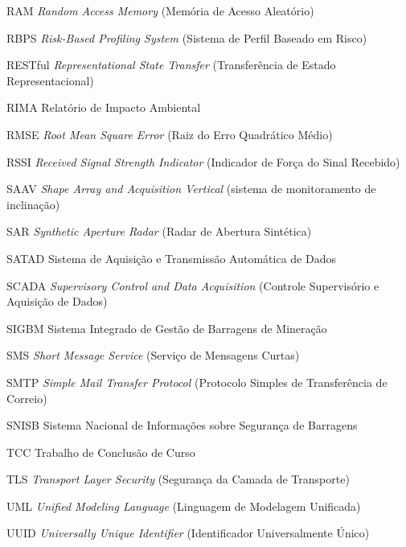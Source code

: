 \begin{siglas}
    \item[RAM] \textit{Random Access Memory} (Memória de Acesso Aleatório)
    \item[RBPS] \textit{Risk-Based Profiling System} (Sistema de Perfil Baseado em Risco)
    \item[RESTful] \textit{Representational State Transfer} (Transferência de Estado Representacional)
    \item[RIMA] Relatório de Impacto Ambiental
    \item[RMSE] \textit{Root Mean Square Error} (Raiz do Erro Quadrático Médio)
    \item[RSSI] \textit{Received Signal Strength Indicator} (Indicador de Força do Sinal Recebido)
    \item[SAAV] \textit{Shape Array and Acquisition Vertical} (sistema de monitoramento de inclinação)
    \item[SAR] \textit{Synthetic Aperture Radar} (Radar de Abertura Sintética)
    \item[SATAD] Sistema de Aquisição e Transmissão Automática de Dados
    \item[SCADA] \textit{Supervisory Control and Data Acquisition} (Controle Supervisório e Aquisição de Dados)
    \item[SIGBM] Sistema Integrado de Gestão de Barragens de Mineração
    \item[SMS] \textit{Short Message Service} (Serviço de Mensagens Curtas)
    \item[SMTP] \textit{Simple Mail Transfer Protocol} (Protocolo Simples de Transferência de Correio)
    \item[SNISB] Sistema Nacional de Informações sobre Segurança de Barragens
    \item[TCC] Trabalho de Conclusão de Curso
    \item[TLS] \textit{Transport Layer Security} (Segurança da Camada de Transporte)
    \item[UML] \textit{Unified Modeling Language} (Linguagem de Modelagem Unificada)
    \item[UUID] \textit{Universally Unique Identifier} (Identificador Universalmente Único)
\end{siglas}